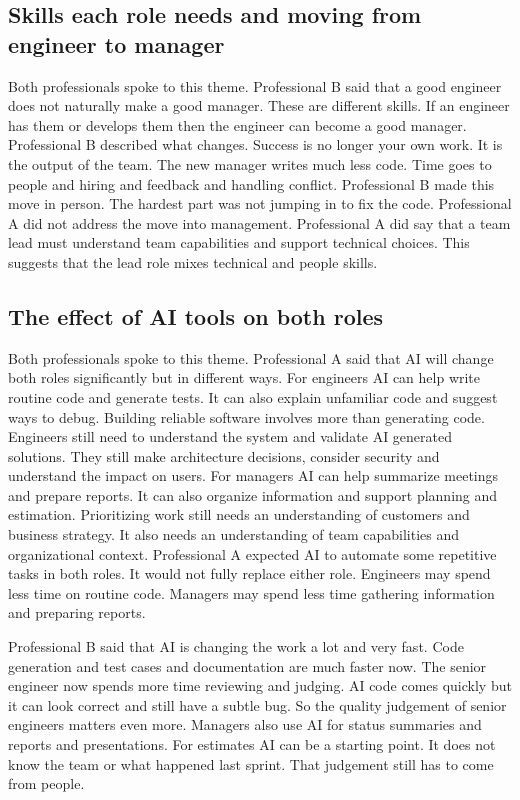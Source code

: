 \documentclass[conference]{IEEEtran}
\begin{document}
\subsection{Skills each role needs and moving from engineer to manager}

Both professionals spoke to this theme. Professional B said that a good engineer does not naturally make a good manager. These are different skills. If an engineer has them or develops them then the engineer can become a good manager. Professional B described what changes. Success is no longer your own work. It is the output of the team. The new manager writes much less code. Time goes to people and hiring and feedback and handling conflict. Professional B made this move in person. The hardest part was not jumping in to fix the code. Professional A did not address the move into management. Professional A did say that a team lead must understand team capabilities and support technical choices. This suggests that the lead role mixes technical and people skills.

\subsection{The effect of AI tools on both roles}

Both professionals spoke to this theme. Professional A said that AI will change both roles significantly but in different ways. For engineers AI can help write routine code and generate tests. It can also explain unfamiliar code and suggest ways to debug. Building reliable software involves more than generating code. Engineers still need to understand the system and validate AI generated solutions. They still make architecture decisions, consider security and understand the impact on users. For managers AI can help summarize meetings and prepare reports. It can also organize information and support planning and estimation. Prioritizing work still needs an understanding of customers and business strategy. It also needs an understanding of team capabilities and organizational context. Professional A expected AI to automate some repetitive tasks in both roles. It would not fully replace either role. Engineers may spend less time on routine code. Managers may spend less time gathering information and preparing reports.

Professional B said that AI is changing the work a lot and very fast. Code generation and test cases and documentation are much faster now. The senior engineer now spends more time reviewing and judging. AI code comes quickly but it can look correct and still have a subtle bug. So the quality judgement of senior engineers matters even more. Managers also use AI for status summaries and reports and presentations. For estimates AI can be a starting point. It does not know the team or what happened last sprint. That judgement still has to come from people.
\end{document}
